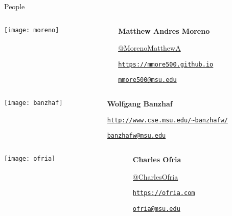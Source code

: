 \begin{frame}{People}

\vspace{1ex}

\begin{columns}
\begin{column}{0.25\textwidth}
  \centering
  \texttt{[image: moreno]}
\end{column}
\begin{column}{0.75\textwidth}
  \textbf{Matthew Andres Moreno}

  \href{https://twitter.com/MorenoMatthewA}{{\faTwitter} @MorenoMatthewA}

  \href{https://mmore500.github.io}{{\faGlobe} \texttt{https://mmore500.github.io}}

  \href{mailto: mmore500@msu.edu}{{\faEnvelope} \texttt{mmore500@msu.edu}}

\end{column}
\end{columns}

\vspace{1ex}

\begin{columns}
\begin{column}{0.25\textwidth}
  \centering
  \texttt{[image: banzhaf]}
\end{column}

\begin{column}{0.75\textwidth}
  \textbf{Wolfgang Banzhaf}

  \href{http://www.cse.msu.edu/~banzhafw/}{{\faGlobe} \texttt{http://www.cse.msu.edu/\textasciitilde{}banzhafw/}}

  \href{mailto: banzhafw@msu.edu}{{\faEnvelope} \texttt{banzhafw@msu.edu}}

\end{column}
\end{columns}

\vspace{1ex}

\begin{columns}
\begin{column}{0.25\textwidth}
  \centering
  \texttt{[image: ofria]}
\end{column}

\begin{column}{0.75\textwidth}
  \textbf{Charles Ofria}

  \href{https://twitter.com/CharlesOfria}{{\faTwitter} @CharlesOfria}

  \href{https://ofria.com}{{\faGlobe} \texttt{https://ofria.com}}

  \href{mailto: ofria@msu.edu}{{\faEnvelope} \texttt{ofria@msu.edu}}

\end{column}
\end{columns}

\end{frame}

